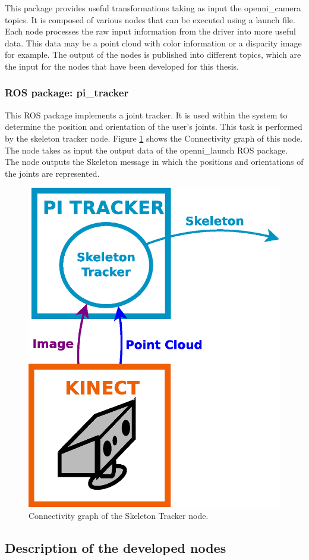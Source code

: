 This package provides useful transformations taking as input the openni\_camera topics. %
It is composed of various nodes that can be executed using a launch file. 
Each node processes the raw input information from the driver into more useful data. 
This data may be a point cloud with color information or a disparity image for example. 
The output of the nodes is published into different topics, which are the input for the nodes that have been developed for this thesis.

\subsubsection{ROS package: pi\_tracker}
\label{pi_tracker}
This ROS package implements a joint tracker.
It is used within the system to determine the position and orientation of the user's joints. 
This task is performed by the skeleton tracker node.  
Figure \ref{diagram_skeleton} shows the Connectivity graph of this node. 
The node takes as input the output data of the openni\_launch ROS package. 
The node outputs the Skeleton message in which the positions and orientations of the joints are represented. 
	\begin{figure}[H]
			\begin{center}
			\includegraphics[width=0.26\linewidth]{img/diagrams/node_pi_tracker.eps}
			\caption[Skeleton Tracker I/O]{Connectivity graph of the Skeleton Tracker node.}
			\label{diagram_skeleton}
			\end{center}
		\end{figure}




\subsection{Description of the developed nodes}
\label{nodes}


